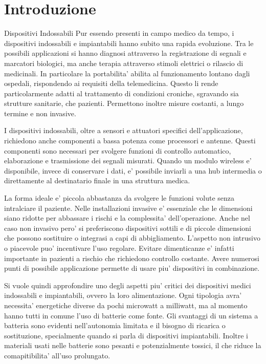 \chapter{Introduzione}

\begin{section}{Dispositivi Indossabili}
    Pur essendo presenti in campo medico da tempo, i dispositivi indossabili e impiantabili hanno subito una rapida evoluzione. Tra le possibili applicazioni si hanno diagnosi attraverso la registrazione di segnali e marcatori biologici, ma anche terapia attraverso stimoli elettrici o rilascio di medicinali. In particolare la portabilita' abilita al funzionamento lontano dagli ospedali, rispondendo ai requisiti della telemedicina. Questo li rende particolarmente adatti al trattamento di condizioni croniche, sgravando sia strutture sanitarie, che pazienti. Permettono inoltre misure costanti, a lungo termine e non invasive. 

    I dispositivi indossabili, oltre a sensori e attuatori specifici dell'applicazione, richiedono anche componenti a bassa potenza come processori e antenne. Questi componenti sono necessari per svolgere funzioni di controllo automatico, elaborazione e trasmissione dei segnali misurati. Quando un modulo wireless e' disponibile, invece di conservare i dati, e' possibile inviarli a una hub intermedia o direttamente al destinatario finale in una struttura medica.

    La forma ideale e' piccola abbastanza da svolgere le funzioni volute senza intralciare il paziente. Nelle installazioni invasive e' essenziale che le dimensioni siano ridotte per abbassare i rischi e la complessita' dell'operazione. Anche nel caso non invasivo pero' si preferiscono dispositivi sottili e di piccole dimensioni che possono sostituire o integrasi a capi di abbigliamento. L'aspetto non intrusivo o piacevole puo' incentivare l'uso regolare. Evitare dimenticanze e' infatti importante in pazienti a rischio che richiedono controllo costante. Avere numerosi punti di possibile applicazione permette di usare piu' dispositivi in combinazione.
    
    Si vuole quindi approfondire uno degli aspetti piu' critici dei dispositivi medici indossabili e impiantabili, ovvero la loro alimentazione. Ogni tipologia avra' necessita' energetiche diverse da pochi microwatt a milliwatt, ma al momento hanno tutti in comune l'uso di batterie come fonte. Gli svantaggi di un sistema a batteria sono evidenti nell'autonomia limitata e il bisogno di ricarica o sostituzione, specialmente quando si parla di dispositivi impiantabili. Inoltre i materiali usati nelle batterie sono pesanti e potenzialmente tossici, il che riduce la comapitibilita' all'uso prolungato.
\end{section}

